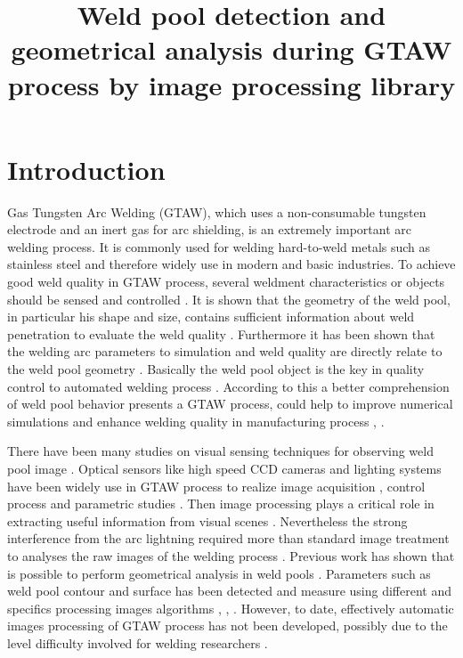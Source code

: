 \title{ Weld pool detection and geometrical analysis during GTAW process by image processing library}


\section{Introduction}

Gas Tungsten Arc Welding (GTAW), which uses a non-consumable tungsten electrode and an inert gas for arc shielding, is an extremely important arc welding process. It is commonly used for welding hard-to-weld metals such as stainless steel \cite{JUANG} and therefore widely use in modern and basic industries. To achieve good weld quality in GTAW process, several weldment characteristics or objects should be sensed and controlled \cite{DOUMANIDIS}. It is shown that the geometry of the weld pool, in particular his shape and size, contains sufficient information about weld penetration to evaluate the weld quality \cite{ZHANG}. Furthermore it has been shown that the welding arc parameters to simulation and weld quality are directly relate to the weld pool geometry \cite{LU}.
Basically the weld pool object is the key in quality control to automated welding process \cite{KOVACEVIC}. 
According to this a better comprehension of weld pool behavior presents a GTAW process, could help to improve numerical simulations and enhance welding quality in manufacturing process \cite{LIN}, \cite{WU1}. 

There have been many studies on visual sensing techniques for observing weld pool image \cite{BAE}. Optical sensors like high speed CCD cameras and lighting systems have been widely use in GTAW process to realize image acquisition \cite{GUANGJUN}, control process \cite{BAE} and parametric studies \cite{BALSAMO}. Then image processing plays a critical role in extracting useful information from visual scenes \cite{WANG}. Nevertheless the strong interference from the arc lightning required more than standard image treatment to analyses the raw images of the welding process \cite{NORDBRUCH}. Previous work has shown that is possible to perform geometrical analysis in weld pools \cite{WU1}. Parameters such as weld pool contour and surface has been detected and measure using different and specifics processing images algorithms \cite{KOVACEVIC}, \cite{WU1}, \cite{SAEED}. However, to date, effectively automatic images processing of GTAW process has not been developed, possibly due to the level difficulty involved for welding researchers \cite{WANG}.


